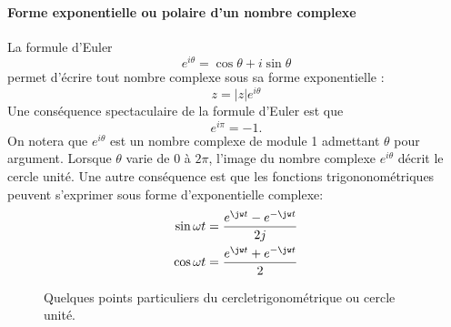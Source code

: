 \paragraph{Forme exponentielle ou polaire d'un nombre complexe}
La formule d'Euler 
$$
e^{i\theta}=\cos\theta+i\sin\theta
$$
permet d'écrire tout nombre complexe sous sa forme exponentielle : 
$$
z=|z|e^{i\theta}
$$
Une conséquence spectaculaire de la formule d'Euler est que
$$
e^{i\pi}=-1.
$$
On notera que $e^{i\theta}$ est un nombre complexe de module 1 admettant 
$\theta$ pour argument. Lorsque $\theta$ varie de $0$ à $2\pi$, l'image du 
nombre complexe $e^{i\theta}$ décrit le cercle unité.
Une autre conséquence est que les fonctions trigononométriques peuvent 
s'exprimer sous forme d'exponentielle complexe:
\begin{align*}
    \sin{\omega t}&=\dfrac{e^{\jw t}-e^{-\jw t}}{2j} \\
    \cos{\omega t}&=\dfrac{e^{\jw t}+e^{-\jw t}}{2}
\end{align*}
\begin{figure}[!ht]
    \centering
    
    \caption{Quelques points particuliers du cercletrigonométrique 
    ou cercle unité.}
\end{figure}
